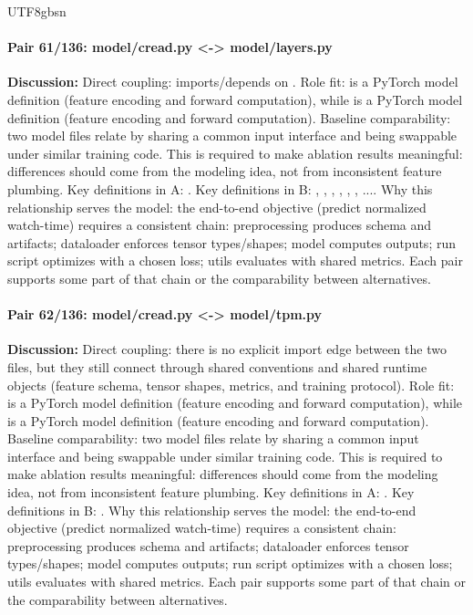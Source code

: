 \documentclass[11pt]{article}
\begin{document}
\begin{CJK*}{UTF8}{gbsn}
\paragraph{Pair 61/136: model/cread.py <-> model/layers.py}
\textbf{Discussion:} Direct coupling: \texttt{} imports/depends on \texttt{}. Role fit: \texttt{} is a PyTorch model definition (feature encoding and forward computation), while \texttt{} is a PyTorch model definition (feature encoding and forward computation). Baseline comparability: two model files relate by sharing a common input interface and being swappable under similar training code. This is required to make ablation results meaningful: differences should come from the modeling idea, not from inconsistent feature plumbing. Key definitions in A: \texttt{}. Key definitions in B: \texttt{}, \texttt{}, \texttt{}, \texttt{}, \texttt{}, \texttt{}, .... Why this relationship serves the model: the end-to-end objective (predict normalized watch-time) requires a consistent chain: preprocessing produces schema and artifacts; dataloader enforces tensor types/shapes; model computes outputs; run script optimizes with a chosen loss; utils evaluates with shared metrics. Each pair supports some part of that chain or the comparability between alternatives.

\paragraph{Pair 62/136: model/cread.py <-> model/tpm.py}
\textbf{Discussion:} Direct coupling: there is no explicit import edge between the two files, but they still connect through shared conventions and shared runtime objects (feature schema, tensor shapes, metrics, and training protocol). Role fit: \texttt{} is a PyTorch model definition (feature encoding and forward computation), while \texttt{} is a PyTorch model definition (feature encoding and forward computation). Baseline comparability: two model files relate by sharing a common input interface and being swappable under similar training code. This is required to make ablation results meaningful: differences should come from the modeling idea, not from inconsistent feature plumbing. Key definitions in A: \texttt{}. Key definitions in B: \texttt{}. Why this relationship serves the model: the end-to-end objective (predict normalized watch-time) requires a consistent chain: preprocessing produces schema and artifacts; dataloader enforces tensor types/shapes; model computes outputs; run script optimizes with a chosen loss; utils evaluates with shared metrics. Each pair supports some part of that chain or the comparability between alternatives.


\end{CJK*}
\end{document}
